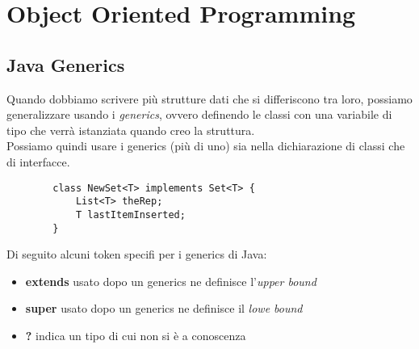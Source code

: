 \newpage
\section{Object Oriented Programming}

\subsection{Java Generics}
Quando dobbiamo scrivere più strutture dati che si differiscono tra loro, possiamo generalizzare usando i \textit{generics}, ovvero definendo le classi con una variabile di tipo che verrà istanziata quando creo la struttura. \\
Possiamo quindi usare i generics (più di uno) sia nella dichiarazione di classi che di interfacce.

\begin{example}
	\begin{lstlisting}
		class NewSet<T> implements Set<T> {
			List<T> theRep;
			T lastItemInserted;
		}
	\end{lstlisting}
\end{example}

Di seguito alcuni token specifi per i generics di Java:
\begin{itemize}
	\item \textbf{extends} usato dopo un generics ne definisce l'\textit{upper bound}
	\item \textbf{super} usato dopo un generics ne definisce il \textit{lowe bound}
	\item \textbf{?} indica un tipo di cui non si è a conoscenza
\end{itemize}

